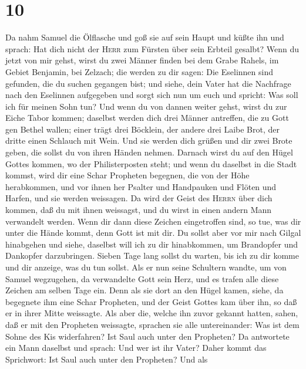 \hypertarget{section-9}{%
\section{10}\label{section-9}}

 Da nahm Samuel die Ölflasche und goß sie auf sein Haupt
und küßte ihn und sprach: Hat dich nicht der \textsc{Herr} zum Fürsten
über sein Erbteil gesalbt?  Wenn du jetzt von mir gehst,
wirst du zwei Männer finden bei dem Grabe Rahels, im Gebiet Benjamin,
bei Zelzach; die werden zu dir sagen: Die Eselinnen sind gefunden, die
du suchen gegangen bist; und siehe, dein Vater hat die Nachfrage nach
den Eselinnen aufgegeben und sorgt sich nun um euch und spricht: Was
soll ich für meinen Sohn tun?  Und wenn du von dannen
weiter gehst, wirst du zur Eiche Tabor kommen; daselbst werden dich drei
Männer antreffen, die zu Gott gen Bethel wallen; einer trägt drei
Böcklein, der andere drei Laibe Brot, der dritte einen Schlauch mit
Wein.  Und sie werden dich grüßen und dir zwei Brote
geben, die sollst du von ihren Händen nehmen.  Darnach
wirst du auf den Hügel Gottes kommen, wo der Philisterposten steht; und
wenn du daselbst in die Stadt kommst, wird dir eine Schar Propheten
begegnen, die von der Höhe herabkommen, und vor ihnen her Psalter und
Handpauken und Flöten und Harfen, und sie werden weissagen.
 Da wird der Geist des \textsc{Herrn} über dich kommen,
daß du mit ihnen weissagst, und du wirst in einen andern Mann verwandelt
werden.  Wenn dir dann diese Zeichen eingetroffen sind, so
tue, was dir unter die Hände kommt, denn Gott ist mit dir.
 Du sollst aber vor mir nach Gilgal hinabgehen und siehe,
daselbst will ich zu dir hinabkommen, um Brandopfer und Dankopfer
darzubringen. Sieben Tage lang sollst du warten, bis ich zu dir komme
und dir anzeige, was du tun sollst.  Als er nun seine
Schultern wandte, um von Samuel wegzugehen, da verwandelte Gott sein
Herz, und es trafen alle diese Zeichen am selben Tage ein.
 Denn als sie dort an den Hügel kamen, siehe, da
begegnete ihm eine Schar Propheten, und der Geist Gottes kam über ihn,
so daß er in ihrer Mitte weissagte.  Als aber die, welche
ihn zuvor gekannt hatten, sahen, daß er mit den Propheten weissagte,
sprachen sie alle untereinander: Was ist dem Sohne des Kis widerfahren?
Ist Saul auch unter den Propheten?  Da antwortete ein
Mann daselbst und sprach: Und wer ist ihr Vater? Daher kommt das
Sprichwort: Ist Saul auch unter den Propheten?  Und als
